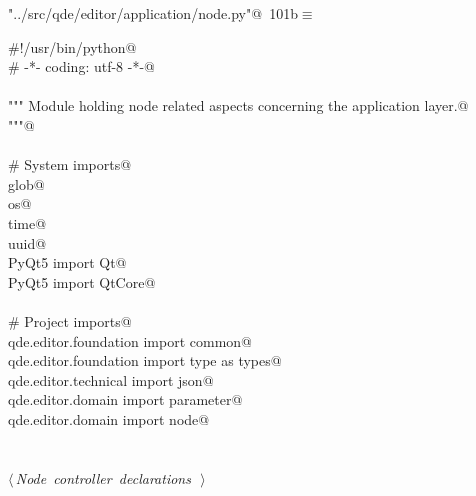 \documentclass[
    a4paper,      %
    10pt,         %
    openright,    %
    notitlepage,  %
    parskip=half, %
]{scrreprt}       %
\theoremstyle{definition}                    %
\begin{document}
\begin{flushleft} \small
\begin{minipage}{\linewidth}\label{scrap163}\raggedright\small
{} \verb@"../src/qde/editor/application/node.py"@\nobreak\ {\footnotesize {101b}}$\equiv$
\vspace{-1ex}
\begin{list}{}{} \item
\mbox{}\lstinline@#!/usr/bin/python@\\
\mbox{}\lstinline@# -*- coding: utf-8 -*-@\\
\mbox{}\lstinline@@\\
\mbox{}\lstinline@""" Module holding node related aspects concerning the application layer.@\\
\mbox{}\lstinline@"""@\\
\mbox{}\lstinline@@\\
\mbox{}\lstinline@# System imports@\\
\mbox{}\lstinline@import glob@\\
\mbox{}\lstinline@import os@\\
\mbox{}\lstinline@import time@\\
\mbox{}\lstinline@import uuid@\\
\mbox{}\lstinline@from PyQt5 import Qt@\\
\mbox{}\lstinline@from PyQt5 import QtCore@\\
\mbox{}\lstinline@@\\
\mbox{}\lstinline@# Project imports@\\
\mbox{}\lstinline@from qde.editor.foundation import common@\\
\mbox{}\lstinline@from qde.editor.foundation import type as types@\\
\mbox{}\lstinline@from qde.editor.technical import json@\\
\mbox{}\lstinline@from qde.editor.domain import parameter@\\
\mbox{}\lstinline@from qde.editor.domain import node@\\
\mbox{}\lstinline@@\\
\mbox{}\lstinline@@\\
\mbox{}\lstinline@@\hbox{$\langle\,${\itshape Node controller declarations}\nobreak\ {\footnotesize {}}$\,\rangle$}\lstinline@@\\
\mbox{}\lstinline@@{\NWsep}
\end{list}
\vspace{-1.5ex}
\footnotesize
\begin{list}{}{\setlength{\itemsep}{-\parsep}\setlength{\itemindent}{-\leftmargin}}

\item{}
\end{list}
\end{minipage}\vspace{4ex}
\end{flushleft}
\end{document}
